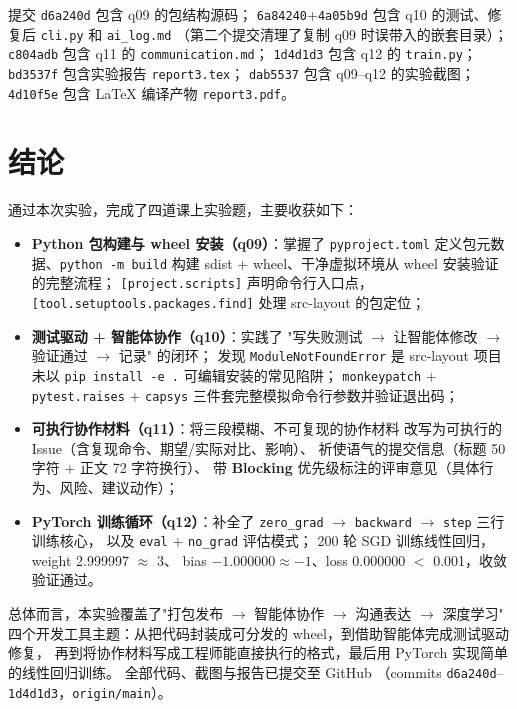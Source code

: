 \documentclass[a4paper,11pt]{ctexart}
\begin{document}
提交 \texttt{d6a240d} 包含 q09 的包结构源码；
\texttt{6a84240}+\texttt{4a05b9d} 包含 q10 的测试、修复后 \texttt{cli.py} 和 \texttt{ai\_log.md}
（第二个提交清理了复制 q09 时误带入的嵌套目录）；
\texttt{c804adb} 包含 q11 的 \texttt{communication.md}；
\texttt{1d4d1d3} 包含 q12 的 \texttt{train.py}；
\texttt{bd3537f} 包含实验报告 \texttt{report3.tex}；
\texttt{dab5537} 包含 q09--q12 的实验截图；
\texttt{4d10f5e} 包含 \LaTeX{} 编译产物 \texttt{report3.pdf}。

\section{结论}

通过本次实验，完成了四道课上实验题，主要收获如下：

\begin{itemize}
  \item \textbf{Python 包构建与 wheel 安装（q09）}：掌握了
        \texttt{pyproject.toml} 定义包元数据、\texttt{python -m build}
        构建 sdist + wheel、干净虚拟环境从 wheel 安装验证的完整流程；
        \texttt{[project.scripts]} 声明命令行入口点，
        \texttt{[tool.setuptools.packages.find]} 处理 src-layout 的包定位；
  \item \textbf{测试驱动 + 智能体协作（q10）}：实践了
        "写失败测试 $\to$ 让智能体修改 $\to$ 验证通过 $\to$ 记录" 的闭环；
        发现 \texttt{ModuleNotFoundError} 是 src-layout 项目未以
        \texttt{pip install -e .} 可编辑安装的常见陷阱；
        \texttt{monkeypatch} + \texttt{pytest.raises} + \texttt{capsys}
        三件套完整模拟命令行参数并验证退出码；
  \item \textbf{可执行协作材料（q11）}：将三段模糊、不可复现的协作材料
        改写为可执行的 Issue（含复现命令、期望/实际对比、影响）、
        祈使语气的提交信息（标题 50 字符 + 正文 72 字符换行）、
        带 \textbf{Blocking} 优先级标注的评审意见（具体行为、风险、建议动作）；
  \item \textbf{PyTorch 训练循环（q12）}：补全了
        \texttt{zero\_grad} $\to$ \texttt{backward} $\to$ \texttt{step} 三行训练核心，
        以及 \texttt{eval} + \texttt{no\_grad} 评估模式；
        200 轮 SGD 训练线性回归，weight 2.999997 $\approx$ 3、
        bias $-1.000000 \approx -1$、loss 0.000000 $<$ 0.001，收敛验证通过。
\end{itemize}

总体而言，本实验覆盖了"打包发布 $\to$ 智能体协作 $\to$ 沟通表达 $\to$ 深度学习"
四个开发工具主题：从把代码封装成可分发的 wheel，到借助智能体完成测试驱动修复，
再到将协作材料写成工程师能直接执行的格式，最后用 PyTorch 实现简单的线性回归训练。
全部代码、截图与报告已提交至 GitHub
（commits \texttt{d6a240d}--\texttt{1d4d1d3}，\texttt{origin/main}）。
\end{document}
